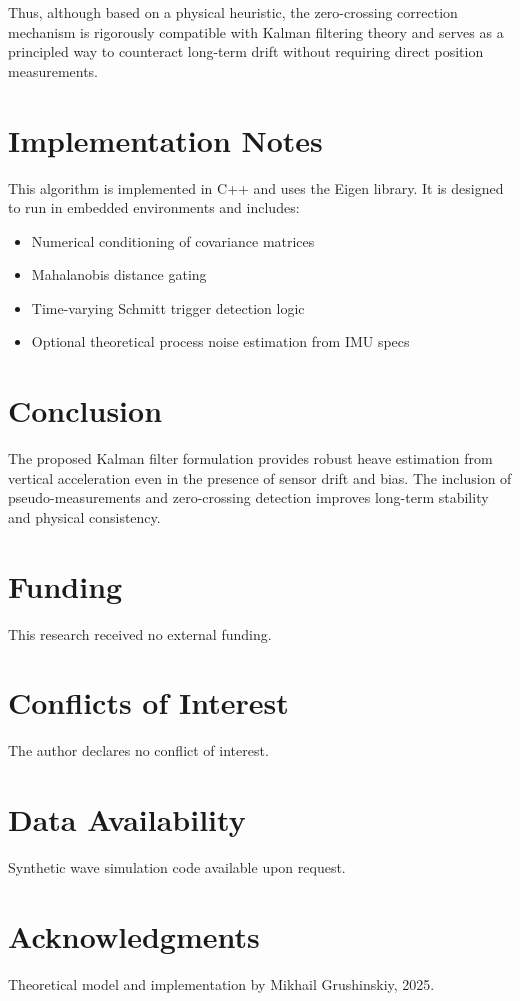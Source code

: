 \documentclass[11pt,letterpaper]{article}
\begin{document}
Thus, although based on a physical heuristic, the zero-crossing correction mechanism is rigorously compatible with Kalman filtering theory and serves as a principled way to counteract long-term drift without requiring direct position measurements.
\section{Implementation Notes}
This algorithm is implemented in C++ and uses the Eigen library. It is designed to run in embedded environments and includes:
\begin{itemize}
  \item Numerical conditioning of covariance matrices
  \item Mahalanobis distance gating
  \item Time-varying Schmitt trigger detection logic
  \item Optional theoretical process noise estimation from IMU specs
\end{itemize}

\section{Conclusion}
The proposed Kalman filter formulation provides robust heave estimation from vertical acceleration even in the presence of sensor drift and bias. The inclusion of pseudo-measurements and zero-crossing detection improves long-term stability and physical consistency.


\section*{Funding}
This research received no external funding.

\section*{Conflicts of Interest}
The author declares no conflict of interest.

\section*{Data Availability}
Synthetic wave simulation code available upon request.

\section*{Acknowledgments}
Theoretical model and implementation by Mikhail Grushinskiy, 2025.
\end{document}
